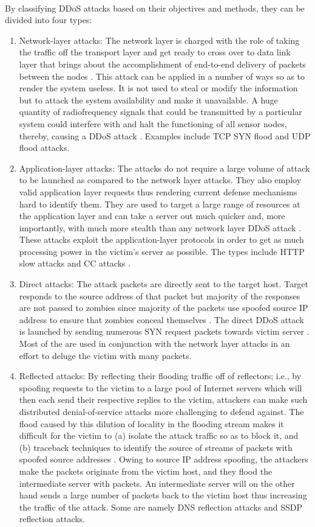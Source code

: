 \\ 
By classifying DDoS attacks based on their objectives and methods, they can be divided into four types: 
\begin{enumerate}
    \item Network-layer attacks: The network layer is charged with the role of taking the traffic off the transport layer and get ready to cross over to data link layer that brings about the accomplishment of end-to-end delivery of packets between the nodes \cite{g2016network}. This attack can be applied in a number of ways so as to render the system useless. It is not used to steal or modify the information but to attack the system availability and make it unavailable. A huge quantity of radiofrequency signals that could be transmitted by a particular system could interfere with and halt the functioning of all sensor nodes, thereby, causing a DDoS attack \cite{ahmed2021networking}. Examples include TCP SYN flood and UDP flood attacks.
    \item Application-layer attacks: The attacks do not require a large volume of attack to be launched as compared to the network layer attacks. They also employ valid application layer requests thus rendering current defense mechanisms hard to identify them. They are used to target a large range of resources at the application layer and can take a server out much quicker and, more importantly, with much more stealth than any network layer DDoS attack \cite{praseed2018ddos}. These attacks exploit the application-layer protocols in order to get as much processing power in the victim’s server as possible. The types include HTTP slow attacks and CC attacks \cite{shema2010seven}. 
    \item Direct attacks: The attack packets are directly sent to the target host. Target responds to the source address of that packet but majority of the responses are not passed to zombies since majority of the packets use spoofed source IP address to ensure that zombies conceal themselves \cite{park2014computer}. The direct DDoS attack is launched by sending numerous SYN request packets towards victim server \cite{pan2005parallel}. Most of the are used in conjunction with the network layer attacks in an effort to deluge the victim with many packets.
    \item Reflected attacks: By reflecting their flooding traffic off of reflectors; i.e., by spoofing requests to the victim to a large pool of Internet servers which will then each send their respective replies to the victim, attackers can make such distributed denial-of-service attacks more challenging to defend against. The flood caused by this dilution of locality in the flooding stream makes it difficult for the victim to (a) isolate the attack traffic so as to block it, and (b) traceback techniques to identify the source of streams of packets with spoofed source addresses \cite{paxson2001analysis}. Owing to source IP address spoofing, the attackers make the packets originate from the victim host, and they flood the intermediate server with packets. An intermediate server will on the other hand sends a large number of packets back to the victim host thus increasing the traffic of the attack. Some are namely DNS reflection attacks and SSDP reflection attacks.
\end{enumerate}

